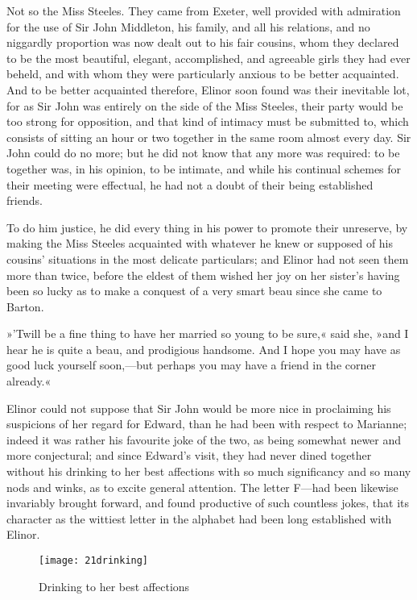 Not so the Miss Steeles. They came from Exeter, well provided with admiration for the use of Sir John Middleton, his family, and all his relations, and no niggardly proportion was now dealt out to his fair cousins, whom they declared to be the most beautiful, elegant, accomplished, and agreeable girls they had ever beheld, and with whom they were particularly anxious to be better acquainted. And to be better acquainted therefore, Elinor soon found was their inevitable lot, for as Sir John was entirely on the side of the Miss Steeles, their party would be too strong for opposition, and that kind of intimacy must be submitted to, which consists of sitting an hour or two together in the same room almost every day. Sir John could do no more; but he did not know that any more was required: to be together was, in his opinion, to be intimate, and while his continual schemes for their meeting were effectual, he had not a doubt of their being established friends.

To do him justice, he did every thing in his power to promote their unreserve, by making the Miss Steeles acquainted with whatever he knew or supposed of his cousins’ situations in the most delicate particulars; and Elinor had not seen them more than twice, before the eldest of them wished her joy on her sister’s having been so lucky as to make a conquest of a very smart beau since she came to Barton.

»’Twill be a fine thing to have her married so young to be sure,« said she, »and I hear he is quite a beau, and prodigious handsome. And I hope you may have as good luck yourself soon,—but perhaps you may have a friend in the corner already.«

Elinor could not suppose that Sir John would be more nice in proclaiming his suspicions of her regard for Edward, than he had been with respect to Marianne; indeed it was rather his favourite joke of the two, as being somewhat newer and more conjectural; and since Edward’s visit, they had never dined together without his drinking to her best affections with so much significancy and so many nods and winks, as to excite general attention. The letter F—had been likewise invariably brought forward, and found productive of such countless jokes, that its character as the wittiest letter in the alphabet had been long established with Elinor.

\begin{figure}[tbph]
\centering
\texttt{[image: 21drinking]}
\caption{Drinking to her best affections}
\end{figure}

